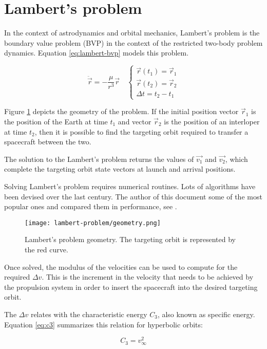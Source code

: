 \section{Lambert's problem}

In the context of astrodynamics and orbital mechanics, Lambert's problem is the
boundary value problem (BVP) in the context of the restricted two-body problem
dynamics. Equation \ref{eq:lambert-bvp} models this problem.

\begin{equation}
    \ddot{\vec{r}} = -\frac{\mu}{r^3}\vec{r} \quad \begin{cases}
        \vec{r}(t_1) = \vec{r}_1 \\ 
        \vec{r}(t_2) = \vec{r}_2 \\ 
        \Delta t = t_2 - t_1
    \end{cases}
    \label{eq:lambert-bvp}
\end{equation}

Figure \ref{fig:lambert-geometry} depicts the geometry of the problem. If the
initial position vector $\vec{r}_1$ is the position of the Earth at time $t_1$
and vector $\vec{r}_2$ is the position of an interloper at time $t_2$, then it
is possible to find the targeting orbit required to transfer a spacecraft
between the two.

The solution to the Lambert's problem returns the values of $\vec{v_1}$ and
$\vec{v_2}$, which complete the targeting orbit state vectors at launch and
arrival positions.

Solving Lambert's problem requires numerical routines. Lots of algorithms have
been devised over the last century. The author of this document some of the most
popular ones and compared them in performance, see \cite{martinez2021}.

\begin{figure}[H]
    \centering
    \texttt{[image: lambert-problem/geometry.png]}
    \caption{Lambert's problem geometry. The targeting orbit is represented by the red curve.}
    \label{fig:lambert-geometry}
\end{figure}

Once solved, the modulus of the velocities can be used to compute for the
required $\Delta v$. This is the increment in the velocity that needs to be
achieved by the propulsion system in order to insert the spacecraft into the
desired targeting orbit.

The $\Delta v$ relates with the characteristic energy $C_3$, also known as
specific energy. Equation \ref{eq:c3} summarizes this relation for hyperbolic
orbits:

\begin{equation}
        C_3 = v_{\infty}^2
        \label{eq:c3}
\end{equation}
